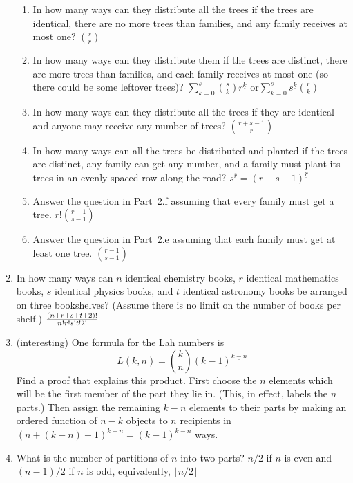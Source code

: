 \documentclass[10pt,]{book}
\theoremstyle{plain}
\theoremstyle{definition}
\numberwithin{equation}{chapter}
\begin{document}
\begin{enumerate}
\begin{enumerate}
%
\item\hypertarget{li-23}{}In how many ways can they distribute all the trees if the trees are identical, there are no more trees than families,   and any family receives at most one? \(s\choose r\)%
%
\item\hypertarget{li-24}{}In how many ways can they distribute them if the trees are distinct, there are more trees than families, and each family receives at most one (so there could be some leftover trees)? \(\sum_{k=0}^s {s\choose k}r^{\underline{k}}\) or\(\sum_{k=0}^s s^{\underline{k}}{r\choose k}\)%
%
\item\hypertarget{multisetproblem}{}In how many ways can they distribute all the trees if they are identical and anyone may receive any number of trees? \(r+s-1\choose r\)%
%
\item\hypertarget{orderedfunctionproblem}{}In how many ways can all the trees be distributed and planted if the trees are distinct, any family can get any number, and a family must plant its trees in an evenly spaced row along the road? \(s^{\overline{r}}=(r+s-1)^{\underline{r}}\)%
%
\item\hypertarget{li-27}{}Answer the question in \hyperlink{orderedfunctionproblem}{Part~2.f} assuming that every family must get a tree. \(r!{r-1\choose s-1}\)%
%
\item\hypertarget{li-28}{}Answer the question in \hyperlink{multisetproblem}{Part~2.e} assuming that each family must get at least one tree. \(r-1\choose s-1\)%
%
\end{enumerate}
%
\item\hypertarget{li-29}{}In how many ways can \(n\) identical chemistry books, \(r\) identical mathematics books, \(s\) identical physics books, and \(t\) identical astronomy books be arranged on three bookshelves? (Assume there is no limit on the number of books per shelf.) \({(n+r+s+t+2)! \over n!r!s!t!2!}\)%
%
\item\hypertarget{li-30}{}(interesting) One formula for the Lah numbers is%
\begin{equation*}
L(k,n) = {k\choose n}(k-1)^{\underline{k-n}}
\end{equation*}
Find a proof that explains this product. First choose the \(n\) elements which will be the first member of the part they lie in. (This, in effect, labels the \(n\) parts.) Then assign the remaining \(k-n\) elements to their parts by making an ordered function of \(n-k\) objects to \(n\) recipients in \((n + (k-n) - 1)^{{k-n}} = (k-1)^{{k-n}}\) ways.%
%
\item\hypertarget{li-31}{}What is the number of partitions of \(n\) into two parts? \(n/2\) if \(n\) is even and \((n-1)/2\) if \(n\) is odd, equivalently, \(\lfloor n/2\rfloor\)%

\end{enumerate}
\end{document}
